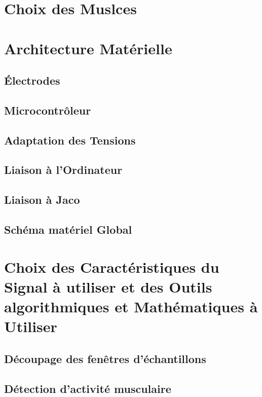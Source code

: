 \documentclass[letterpaper, twoside, 12pt, memoire, creativecommons, hyperref]{thETS}
\begin{document}
\section{Choix des Muslces}

\section{Architecture Matérielle}

\subsection{Électrodes}

\subsection{Microcontrôleur}

\subsection{Adaptation des Tensions}

\subsection{Liaison à l'Ordinateur}

\subsection{Liaison à Jaco}

\subsection{Schéma matériel Global}

\section{Choix des Caractéristiques du Signal à utiliser et des Outils algorithmiques et Mathématiques à Utiliser}

\subsection{Découpage des fenêtres d'échantillons}

\subsection{Détection d'activité musculaire}
\end{document}
